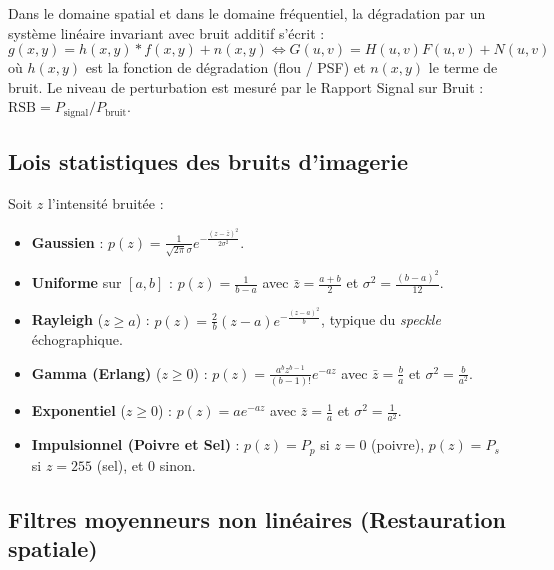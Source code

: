 Dans le domaine spatial et dans le domaine fréquentiel, la dégradation par un système linéaire invariant avec bruit additif s'écrit :
\begin{equation}
    g(x,y) = h(x,y) * f(x,y) + n(x,y) \iff G(u,v) = H(u,v) F(u,v) + N(u,v)
\end{equation}
où $h(x,y)$ est la fonction de dégradation (flou / PSF) et $n(x,y)$ le terme de bruit. Le niveau de perturbation est mesuré par le Rapport Signal sur Bruit : $\text{RSB} = P_{\text{signal}} / P_{\text{bruit}}$.

\subsection{Lois statistiques des bruits d'imagerie}

\begin{proposition}
    Soit $z$ l'intensité bruitée :
    \begin{itemize}
        \item \textbf{Gaussien} : $p(z) = \frac{1}{\sqrt{2\pi}\sigma} e^{-\frac{(z - \bar{z})^2}{2\sigma^2}}$.
        \item \textbf{Uniforme} sur $[a, b]$ : $p(z) = \frac{1}{b-a}$ avec $\bar{z} = \frac{a+b}{2}$ et $\sigma^2 = \frac{(b-a)^2}{12}$.
        \item \textbf{Rayleigh} ($z \geqslant a$) : $p(z) = \frac{2}{b}(z-a) e^{-\frac{(z-a)^2}{b}}$, typique du \emph{speckle} échographique.
        \item \textbf{Gamma (Erlang)} ($z \geqslant 0$) : $p(z) = \frac{a^b z^{b-1}}{(b-1)!} e^{-az}$ avec $\bar{z} = \frac{b}{a}$ et $\sigma^2 = \frac{b}{a^2}$.
        \item \textbf{Exponentiel} ($z \geqslant 0$) : $p(z) = a e^{-az}$ avec $\bar{z} = \frac{1}{a}$ et $\sigma^2 = \frac{1}{a^2}$.
        \item \textbf{Impulsionnel (Poivre et Sel)} : $p(z) = P_p$ si $z=0$ (poivre), $p(z) = P_s$ si $z=255$ (sel), et $0$ sinon.
    \end{itemize}
\end{proposition}

\subsection{Filtres moyenneurs non linéaires (Restauration spatiale)}

